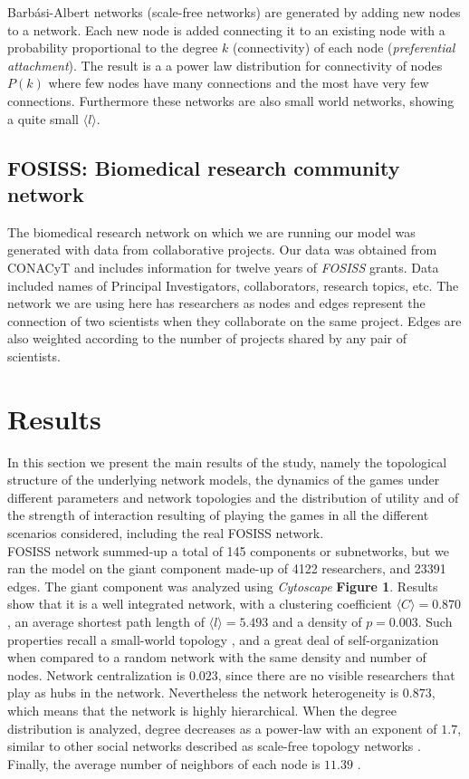 \documentclass[11pt]{article}
\begin{document}
Barb\'asi-Albert networks \cite{Barabasi1999} (scale-free networks) are generated by adding new nodes to a network. Each new node is added connecting it to an existing node with a probability proportional to the degree $k$ (connectivity) of each node (\textit{preferential attachment}). The result is a a power law distribution for connectivity of nodes $P(k)$ where few nodes have many connections and the most have very few connections. Furthermore these networks are also small world networks, showing a quite small $\langle l \rangle$.


\subsection{FOSISS: Biomedical research community network}

The biomedical research network on which we are running our model was generated 
with data from collaborative projects. Our data was obtained from CONACyT and includes information for twelve years of \textit{FOSISS} grants. Data included names of Principal Investigators, collaborators, research topics, etc. The network we are using here has researchers as nodes and edges represent the connection of two scientists when they collaborate on the same project. Edges are also weighted according to the number of projects shared by any pair of scientists.\\


\section{Results}
\label{sec:3}

In this section we present the main results of the study, namely the topological
structure of the underlying network models, the dynamics of the games under
different parameters and network topologies and the distribution of utility and
of the strength of interaction resulting of playing the games in all the
different scenarios considered, including the real FOSISS network.\\


FOSISS network summed-up a total of 145 components or subnetworks, but we ran
the model on the giant component made-up of 4122 researchers, and 23391 edges.
The giant component was analyzed using \textit{Cytoscape} \textbf{Figure
  1}. Results show that it is a well integrated network, with a clustering
coefficient $\langle C \rangle = 0.870$, an average shortest path length of
$\langle l \rangle = 5.493$  and a density of $p = 0.003$. Such properties
recall a small-world topology \cite{Watts1998}, and a great deal of
self-organization when compared to a random network with the same density and
number of nodes. Network centralization is $0.023$, since there are no visible
researchers that play as hubs in the network. Nevertheless the network
heterogeneity is $0.873$, which means that the network is highly
hierarchical. When the degree distribution is analyzed, degree decreases as a
power-law with an exponent of $1.7$, similar to other social networks described
as scale-free topology networks \cite{Barabasi1999}. Finally, the average number
of neighbors of each node is $11.39$ \cite{Shannon2003}.\\
\end{document}
